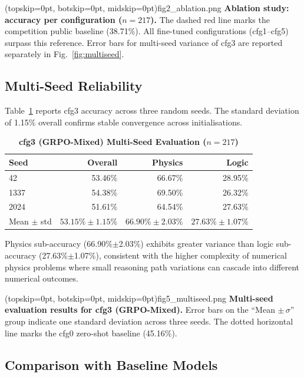 \documentclass{ieeeaccess}
\begin{document}
\Figure[t!](topskip=0pt, botskip=0pt, midskip=0pt){fig2_ablation.png}{%
  \textbf{Ablation study: accuracy per configuration ($n=217$).}
  The dashed red line marks the competition public baseline (38.71\%).
  All fine-tuned configurations (cfg1--cfg5) surpass this reference.
  Error bars for multi-seed variance of cfg3 are reported separately
  in Fig.~\ref{fig:multiseed}.
  \label{fig:ablation}}

\subsection{Multi-Seed Reliability}
\label{sec:multiseed}

Table~\ref{tab:multiseed} reports cfg3 accuracy across three random seeds.
The standard deviation of 1.15\% overall confirms stable convergence
across initialisations.

\begin{table}[t]
\caption{\textbf{cfg3 (GRPO-Mixed) Multi-Seed Evaluation ($n=217$)}}
\label{tab:multiseed}
\centering
\setlength{\tabcolsep}{5pt}
\begin{tabular}{lrrr}
\toprule
\textbf{Seed} & \textbf{Overall} & \textbf{Physics} & \textbf{Logic} \\
\midrule
42            & 53.46\%          & 66.67\%          & 28.95\% \\
1337          & 54.38\%          & 69.50\%          & 26.32\% \\
2024          & 51.61\%          & 64.54\%          & 27.63\% \\
\midrule
Mean $\pm$ std & $53.15\%\pm1.15\%$ & $66.90\%\pm2.03\%$ & $27.63\%\pm1.07\%$ \\
\bottomrule
\end{tabular}
\end{table}

Physics sub-accuracy (66.90\%$\pm$2.03\%) exhibits greater variance than
logic sub-accuracy (27.63\%$\pm$1.07\%), consistent with the higher
complexity of numerical physics problems where small reasoning path
variations can cascade into different numerical outcomes.

\Figure[t!](topskip=0pt, botskip=0pt, midskip=0pt){fig5_multiseed.png}{%
  \textbf{Multi-seed evaluation results for cfg3 (GRPO-Mixed).}
  Error bars on the ``Mean $\pm\,\sigma$'' group indicate one standard
  deviation across three seeds.
  The dotted horizontal line marks the cfg0 zero-shot baseline (45.16\%).
  \label{fig:multiseed}}

\subsection{Comparison with Baseline Models}
\end{document}
